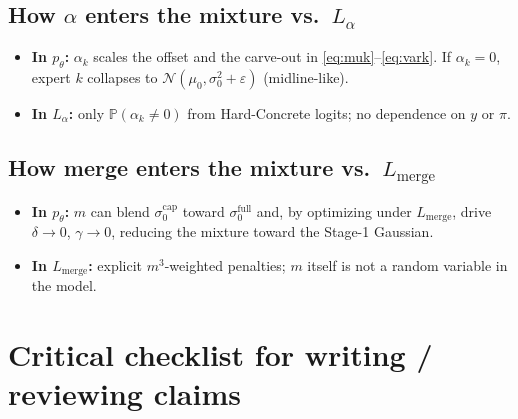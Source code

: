\documentclass[11pt,a4paper]{article}
\theoremstyle{plain}
\theoremstyle{definition}
\theoremstyle{remark}
\newcommand{\Ncal}{\mathcal{N}}
\newcommand{\tht}{\theta}
\begin{document}
\subsection{How \(\alpha\) enters the mixture vs.\ \(L_\alpha\)}
\begin{itemize}[leftmargin=1.2em]
  \item \textbf{In \(p_\tht\):} \(\alpha_k\) scales the offset and the carve-out in
        \eqref{eq:muk}--\eqref{eq:vark}. If \(\alpha_k=0\), expert \(k\) collapses to
        \(\Ncal(\mu_0,\sigma_0^2+\varepsilon)\) (midline-like).
  \item \textbf{In \(L_\alpha\):} only \(\mathbb P(\alpha_k\neq 0)\) from Hard-Concrete
        logits; no dependence on \(y\) or \(\pi\).
\end{itemize}

\subsection{How merge enters the mixture vs.\ \(L_{\mathrm{merge}}\)}
\begin{itemize}[leftmargin=1.2em]
  \item \textbf{In \(p_\tht\):} \(m\) can blend \(\sigma_0^{\mathrm{cap}}\) toward
        \(\sigma_0^{\mathrm{full}}\) and, by optimizing under \(L_{\mathrm{merge}}\),
        drive \(\delta\to 0\), \(\gamma\to 0\), reducing the mixture toward the Stage-1
        Gaussian.
  \item \textbf{In \(L_{\mathrm{merge}}\):} explicit \(m^3\)-weighted penalties; \(m\) itself
        is not a random variable in the model.
\end{itemize}

\section{Critical checklist for writing / reviewing claims}
\end{document}
